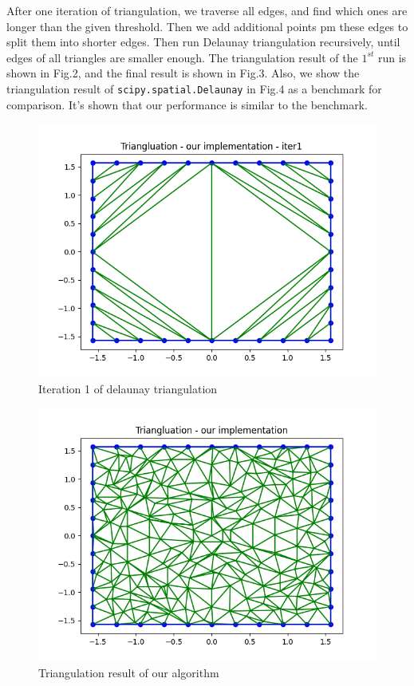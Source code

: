 \documentclass[conference]{IEEEtran}
\begin{document}
    After one iteration of triangulation, we traverse all edges, and find which ones are longer than the given threshold.
    Then we add additional points pm these edges to split them into shorter edges. Then run Delaunay triangulation recursively, 
    until edges of all triangles are smaller enough. The triangulation result of the $1^{st}$ run is shown in Fig.2, and 
    the final result is shown in Fig.3. Also, we show the triangulation result of \texttt{scipy.spatial.Delaunay}\cite{b10} in Fig.4 
    as a benchmark for comparison. It's shown that our performance is similar to the benchmark.
    \begin{figure}[h]
        \centering
        \includegraphics[scale=0.4]{../fig/tri_1st.png}
        \caption{Iteration 1 of delaunay triangulation}
    \end{figure}
    \newpage

    \begin{figure}[h]
        \centering
        \includegraphics[scale=0.4]{../fig/tri_2nd.png}
        \caption{Triangulation result of our algorithm}
    \end{figure}
\end{document}
